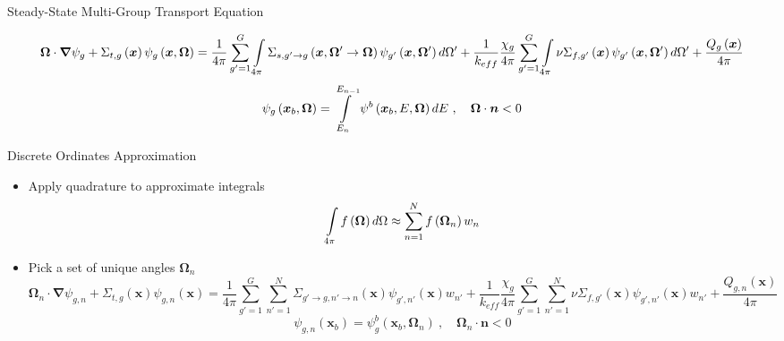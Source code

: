\begin{frame}[t]{Steady-State Multi-Group Transport Equation}    
    
        \begin{dmath*}
            {\bm \Omega \cdot \bm \nabla \psi_g} + {\Sigma_{t,g}\left(\bm 
            x\right)\psi_g\left(\bm x,\bm \Omega\right)} = 
            {\frac{1}{4\pi}\sum_{g'=1}^G \intop_{4\pi} \Sigma_{s,g'\rightarrow 
            g}\left(\bm x,\bm \Omega' \rightarrow \bm \Omega\right) 
            \psi_{g'}\left(\bm x,\bm \Omega'\right) d\Omega'} + 
            {\frac{1}{k_{eff}}\frac{\chi_g}{4\pi} \sum_{g'=1}^{G} \intop_{4\pi} 
            \nu \Sigma_{f,g'}\left(\bm x\right) \psi_{g'}\left(\bm x,\bm 
            \Omega'\right)d\Omega' + \frac{Q_g\left(\bm x\right)}{4\pi}}
        \end{dmath*}
        \begin{equation*}\label{e:multigroupboltzmannBC}
        \psi_g\left(\bm x_b, \bm{\Omega}\right) = \intop_{E_n}^{E_{n-1}} \psi^b\left(\bm x_b, E, \bm{\Omega}\right)dE\ ,\quad \bm{\Omega}\cdot \bm n < 0
        \end{equation*}

\end{frame}


\begin{frame}[t]{Discrete Ordinates Approximation}
  
  \begin{itemize}
    \item Apply quadrature to approximate integrals
    \begin{equation*}
    \intop_{4\pi} f\left(\bm \Omega\right)d\Omega \approx \sum_{n=1}^N 
    f\left(\bm \Omega_n\right) w_n
    \end{equation*}
    \item Pick a set of unique angles $\bm \Omega_n$
    \begin{dmath*}
      \bm\Omega_n\cdot\bm\nabla\psi_{g,n} + \Sigma_{t,g}\left(\bm 
      x\right)\psi_{g,n}\left(\bm x\right) = {\frac{1}{4\pi}\sum_{g'=1}^G 
      \sum_{n'=1}^N \Sigma_{g'\rightarrow g,n'\rightarrow n}\left(\bm 
      x\right)\psi_{g',n'}\left(\bm x\right) w_{n'}} + 
      {\frac{1}{k_{eff}}\frac{\chi_g}{4\pi} \sum_{g'=1}^G \sum_{n'=1}^N 
      \nu\Sigma_{f,g'}\left(\bm x\right)\psi_{g',n'}\left(\bm x\right) w_{n'}} 
      + \frac{Q_{g,n}\left(\bm x\right)}{4\pi}
    \end{dmath*}
    \begin{equation*}
      \psi_{g,n}\left(\bm x_b\right) = \psi_{g}^b\left(\bm 
      x_b,\bm{\Omega}_n\right)\ ,\quad \bm{\Omega}_n\cdot \bm n < 0
    \end{equation*}
  \end{itemize}
  
\end{frame}

